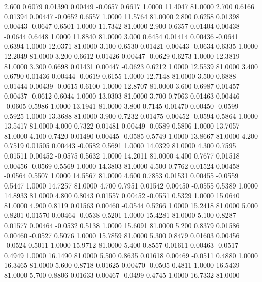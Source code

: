    2.600   0.6079   0.01390   0.00449  -0.0657   0.6617   1.0000  11.4047  81.0000
   2.700   0.6166   0.01394   0.00447  -0.0652   0.6557   1.0000  11.5764  81.0000
   2.800   0.6258   0.01398   0.00443  -0.0647   0.6501   1.0000  11.7342  81.0000
   2.900   0.6357   0.01404   0.00438  -0.0644   0.6448   1.0000  11.8840  81.0000
   3.000   0.6454   0.01414   0.00436  -0.0641   0.6394   1.0000  12.0371  81.0000
   3.100   0.6530   0.01421   0.00443  -0.0634   0.6335   1.0000  12.2049  81.0000
   3.200   0.6612   0.01426   0.00447  -0.0629   0.6273   1.0000  12.3819  81.0000
   3.300   0.6698   0.01431   0.00447  -0.0623   0.6212   1.0000  12.5539  81.0000
   3.400   0.6790   0.01436   0.00444  -0.0619   0.6155   1.0000  12.7148  81.0000
   3.500   0.6888   0.01444   0.00439  -0.0615   0.6100   1.0000  12.8707  81.0000
   3.600   0.6987   0.01457   0.00437  -0.0612   0.6044   1.0000  13.0303  81.0000
   3.700   0.7063   0.01463   0.00446  -0.0605   0.5986   1.0000  13.1941  81.0000
   3.800   0.7145   0.01470   0.00450  -0.0599   0.5925   1.0000  13.3688  81.0000
   3.900   0.7232   0.01475   0.00452  -0.0594   0.5864   1.0000  13.5417  81.0000
   4.000   0.7322   0.01481   0.00449  -0.0589   0.5806   1.0000  13.7057  81.0000
   4.100   0.7420   0.01490   0.00445  -0.0585   0.5749   1.0000  13.8667  81.0000
   4.200   0.7519   0.01505   0.00443  -0.0582   0.5691   1.0000  14.0329  81.0000
   4.300   0.7595   0.01511   0.00452  -0.0575   0.5632   1.0000  14.2011  81.0000
   4.400   0.7677   0.01518   0.00456  -0.0569   0.5569   1.0000  14.3803  81.0000
   4.500   0.7762   0.01524   0.00458  -0.0564   0.5507   1.0000  14.5567  81.0000
   4.600   0.7853   0.01531   0.00455  -0.0559   0.5447   1.0000  14.7257  81.0000
   4.700   0.7951   0.01542   0.00450  -0.0555   0.5389   1.0000  14.8933  81.0000
   4.800   0.8043   0.01557   0.00452  -0.0551   0.5329   1.0000  15.0640  81.0000
   4.900   0.8119   0.01563   0.00460  -0.0544   0.5266   1.0000  15.2418  81.0000
   5.000   0.8201   0.01570   0.00464  -0.0538   0.5201   1.0000  15.4281  81.0000
   5.100   0.8287   0.01577   0.00464  -0.0532   0.5138   1.0000  15.6091  81.0000
   5.200   0.8379   0.01586   0.00460  -0.0527   0.5076   1.0000  15.7859  81.0000
   5.300   0.8479   0.01603   0.00456  -0.0524   0.5011   1.0000  15.9712  81.0000
   5.400   0.8557   0.01611   0.00463  -0.0517   0.4949   1.0000  16.1490  81.0000
   5.500   0.8635   0.01618   0.00469  -0.0511   0.4880   1.0000  16.3465  81.0000
   5.600   0.8718   0.01625   0.00470  -0.0505   0.4811   1.0000  16.5439  81.0000
   5.700   0.8806   0.01633   0.00467  -0.0499   0.4745   1.0000  16.7332  81.0000
